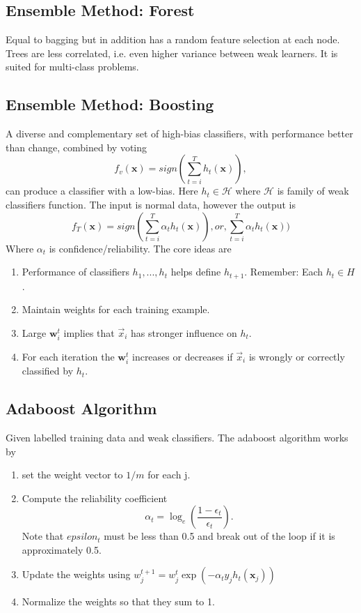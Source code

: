 \documentclass[12pt]{article}
\numberwithin{equation}{section}
\begin{document}
\subsection{Ensemble Method: Forest}
Equal to bagging but in addition has a random feature selection at each node. Trees are less correlated, i.e. even higher variance between weak learners.  It is suited for multi-class problems.

\subsection{Ensemble Method: Boosting}
A diverse and complementary set of high-bias classifiers, with performance better than change, combined by voting
\begin{equation}
f_{v}({\bm{x}}) = sign(\sum_{t=i}^Th_{t}(\bm{x})),
\end{equation}
can produce a classifier with a low-bias. Here $h_{t} \in \mathcal{H}$ where $\mathcal{H}$ is family of weak classifiers function. The input is normal data, however the output is 
\begin{equation}
f_{T}({\bm{x}}) = sign( \sum_{t=i}^T \alpha_{t} h_{t}(\bm{x})), or,  \sum_{t=i}^T \alpha_{t} h_{t}(\bm{x}))
\end{equation}
Where $\alpha_{t}$ is confidence/reliability. The core ideas are
\begin{enumerate}
\item Performance of classifiers $h_{1}, . . . , h_{t}$ helps define $h_{t+1}$. Remember: Each $h_{t} \in H$.
\item Maintain weights for each training example.
\item Large $\bm{w}_{i}^{t}$ implies that $\vec{x}_{i}$ has stronger influence on $h_{t}$.
\item For each iteration the $\bm{w}_{i}^{t}$  increases or decreases if $\vec{x}_{i}$ is wrongly or correctly classified by $h_{t}$.
\end{enumerate}

\subsection{Adaboost Algorithm }
Given labelled training data and weak classifiers. The adaboost algorithm works by
\begin{enumerate}
\item set the weight vector to $1/m$ for each j.
\item Compute the reliability coefficient 
\begin{equation}
\alpha_{t} = \log_{e} (\frac{1-\epsilon_{t}}{\epsilon_{t}}).
\end{equation}
Note that $epsilon_{t}$ must be less than 0.5 and break out of the loop if it is approximately 0.5.

\item Update the weights using $w_{j}^{t+1} =w_{j}^{t} \exp (-\alpha_{t} y_{j} h_{t} (\bm{x}_{j}) ) $
\item Normalize the weights so that they sum to 1.
\end{enumerate}
\end{document}
